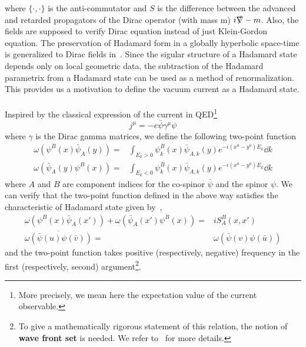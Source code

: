 where $\{\cdot, \cdot\}$ is the anti-commutator and $S$ is the difference between the advanced and retarded propagators of the Dirac operator (with mass m) $i\slashed{\nabla} - m$.
Also, the fields are supposed to verify Dirac equation instead of just Klein-Gordon equation. 
The preservation of Hadamard form in a globally hyperbolic space-time is generalized to Dirac fields in~\cite{Sahlmann2000}.
Since the sigular structure of a Hadamard state depends only on local geometric data, the subtraction of the Hadamard parametrix from a Hadamard state can be used as a method of renormalization.
This provides us a motivation to define the vacuum current as a Hadamard state.
\\\\
Inspired by the classical expression of the current in QED\footnote{
More precisely, we mean here the expectation value of the current observable.
}
\begin{equation*}
j^\mu = -e\bar{\psi}\gamma^\mu\psi
\end{equation*}
where $\gamma$ is the Dirac gamma matrices,
we define the following two-point function
\begin{equation}\label{vacuum-hadamardstate}
\begin{split}
\omega(\psi^B(x)\bar{\psi}_A(y)) = & \int_{E_k >0} \psi_k^B(x)\bar{\psi}_{A,k}(y)e^{-i(x^0-y^0)E_k} \dd k \\
\omega(\bar{\psi}_A(y)\psi^B(x)) = & \int_{E_k <0} \psi_k^B(x)\bar{\psi}_{A,k}(y)e^{-i(x^0-y^0)E_k} \dd k 
\end{split}
\end{equation}
where $A$ and $B$ are component indices for the co-spinor $\bar{\psi}$ and the spinor $\psi$.
We can verify that the two-point function defined in the above way satisfies the characteristic of Hadamard state given by~\cite{Radzikowski1996}, \ie
\begin{equation}\label{vacuum-hadamardcond}
\begin{split}
\omega(\psi^B(x)\bar{\psi}_A(x')) + \omega(\bar{\psi}_A(x')\psi^B(x)) = &
iS^B_A(x,x') \\
\overline{\omega(\bar{\psi}(u)\psi(\bar{v}))} = & \omega(\bar{\psi}(v)\psi(\bar{u}))
\end{split}
\end{equation}
and the two-point function takes positive (respectively, negative) frequency in the first (respectively, second) argument\footnote{
To give a mathematically rigorous statement of this relation, 
the notion of \textbf{wave front set} is needed. 
We refer to~\cite{Radzikowski1996} for more details.
}.
